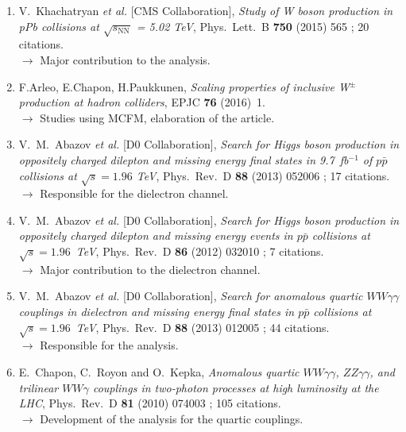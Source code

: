 \documentclass[a4paper,11pt]{article}
\begin{document}
\begin{enumerate}
 \item V.~Khachatryan {\it et al.}  [CMS Collaboration],
  \emph{Study of W boson production in pPb collisions at $\sqrt{s_{\mathrm{NN}}}$ = 5.02 TeV},
  Phys.\ Lett.\ B {\bf 750} (2015) 565 ; 20 citations.\\
  \hspace{5pt} $\to$ Major contribution to the analysis.
  \item F.Arleo, E.Chapon, H.Paukkunen, \emph{Scaling properties of inclusive W$^\pm$ production at hadron colliders}, 
  EPJC {\bf 76} (2016)~1.\\
  \hspace{5pt} $\to$ Studies using MCFM, elaboration of the article.
 \item V.~M.~Abazov {\it et al.}  [D0 Collaboration],
  \emph{Search for Higgs boson production in oppositely charged dilepton and missing energy final states in 9.7\ 
fb$^{-1}$ of $p\bar{p}$ collisions at
$\sqrt{s} = 1.96$ TeV}, Phys.\ Rev.\ D {\bf 88} (2013) 052006 ; 17 citations.\\
\hspace{5pt} $\to$ Responsible for the dielectron channel.
 \item V.~M.~Abazov {\it et al.}  [D0 Collaboration],
  \emph{Search for Higgs boson production in oppositely charged dilepton and missing energy events in $p\bar{p}$ 
collisions at $\sqrt{s} =1.96$\ TeV},
  Phys.\ Rev.\ D {\bf 86} (2012) 032010 ; 7 citations.\\
  \hspace{5pt} $\to$ Major contribution to the dielectron channel.
   \item V.~M.~Abazov {\it et al.}  [D0 Collaboration],
  \emph{Search for anomalous quartic $WW\gamma\gamma$ couplings in dielectron and missing energy final states in 
$p\bar{p}$ collisions at $\sqrt{s} =
1.96$\ TeV}, Phys.\ Rev.\ D {\bf 88} (2013) 012005 ; 44 citations.\\
\hspace{5pt} $\to$ Responsible for the analysis.
 \item E.~Chapon, C.~Royon and O.~Kepka,
  \emph{Anomalous quartic $W W \gamma \gamma$, $Z Z \gamma \gamma$, and trilinear $WW \gamma$ couplings in two-photon 
processes at 
high luminosity at the LHC},
  Phys.\ Rev.\ D {\bf 81} (2010) 074003 ; 105 citations.\\
  \hspace{5pt} $\to$ Development of the analysis for the quartic couplings.
\end{enumerate}
\end{document}
